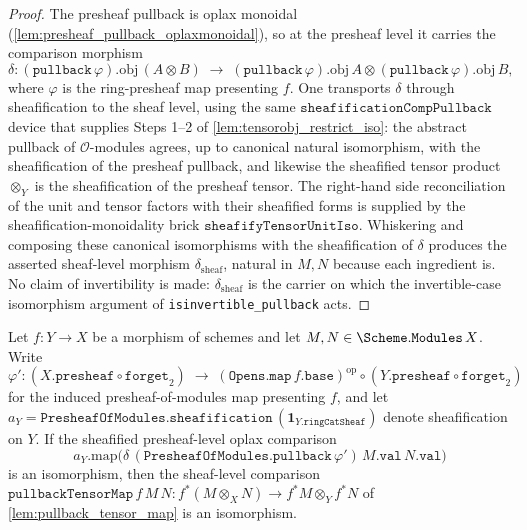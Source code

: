 \begin{proof}
  \leanok
  The presheaf pullback is oplax monoidal (\cref{lem:presheaf_pullback_oplaxmonoidal}),
  so at the presheaf level it carries the comparison morphism
  \[
    \delta : (\mathtt{pullback}\,\varphi).\mathrm{obj}\,(A \otimes B)
      \;\longrightarrow\;
      (\mathtt{pullback}\,\varphi).\mathrm{obj}\,A
        \otimes (\mathtt{pullback}\,\varphi).\mathrm{obj}\,B,
  \]
  where \(\varphi\) is the ring-presheaf map presenting \(f\). One transports \(\delta\)
  through sheafification to the sheaf level, using the same
  \(\mathtt{sheafificationCompPullback}\) device that supplies Steps 1--2 of
  \cref{lem:tensorobj_restrict_iso}: the abstract pullback of \(\mathcal{O}\)-modules
  agrees, up to canonical natural isomorphism, with the sheafification of the presheaf
  pullback, and likewise the sheafified tensor product \(\otimes_Y\) is the
  sheafification of the presheaf tensor. The right-hand side reconciliation of the unit
  and tensor factors with their sheafified forms is supplied by the
  sheafification-monoidality brick \(\mathtt{sheafifyTensorUnitIso}\). Whiskering and
  composing these canonical isomorphisms with the sheafification of \(\delta\) produces
  the asserted sheaf-level morphism \(\delta_{\mathrm{sheaf}}\), natural in \(M, N\)
  because each ingredient is. No claim of invertibility is made: \(\delta_{\mathrm{sheaf}}\)
  is the carrier on which the invertible-case isomorphism argument of
  \texttt{isinvertible\_pullback} acts.
\end{proof}

\begin{lemma}\leanok
  \label{lem:isiso_pullbacktensormap_of_sheafifydelta}
  Let \(f : Y \to X\) be a morphism of schemes and let
  \(M, N \in \Scheme.\mathtt{Modules}\,X\). Write
  \[
    \varphi' :
      (X.\mathtt{presheaf} \circ \mathtt{forget}_2)
      \;\longrightarrow\;
      (\mathtt{Opens.map}\,f.\mathtt{base})^{\mathrm{op}}
        \circ (Y.\mathtt{presheaf} \circ \mathtt{forget}_2)
  \]
  for the induced presheaf-of-modules map presenting \(f\), and let
  \(a_Y = \mathtt{PresheafOfModules.sheafification}\,(\mathbf{1}_{Y.\mathtt{ringCatSheaf}})\)
  denote sheafification on \(Y\). If the sheafified presheaf-level oplax comparison
  \[
    a_Y.\mathrm{map}\bigl(
      \delta\,(\mathtt{PresheafOfModules.pullback}\,\varphi')\,M.\mathtt{val}\,N.\mathtt{val}
    \bigr)
  \]
  is an isomorphism, then the sheaf-level comparison
  \(\mathtt{pullbackTensorMap}\,f\,M\,N : f^*(M \otimes_X N) \to f^*M \otimes_Y f^*N\)
  of \cref{lem:pullback_tensor_map} is an isomorphism.
\end{lemma}

